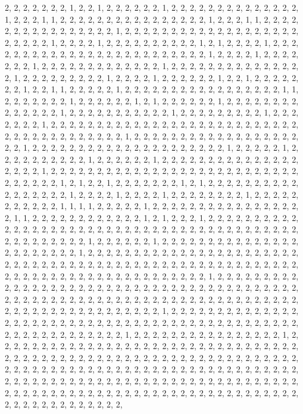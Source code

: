 \documentclass[
]{article}
\begin{document}
\begin{Schunk}
\begin{Soutput}
2, 2, 2, 2, 2, 2, 2, 1, 2, 2, 1, 2, 2, 2, 2, 2, 2, 1, 2, 2, 2, 2, 2, 2, 2, 2, 2, 2, 2, 2, 2, 2, 1, 2, 2, 2, 1, 1, 2, 2, 2, 2, 2, 2, 2, 2, 2, 2, 2, 2, 2, 2, 2, 2, 1, 2, 2, 2, 1, 1, 2, 2, 2, 2, 2, 2, 2, 2, 2, 2, 2, 2, 2, 2, 2, 2, 1, 2, 2, 2, 2, 2, 2, 2, 2, 2, 2, 2, 2, 2, 2, 2, 2, 2, 2, 2, 2, 2, 2, 2, 2, 1, 2, 2, 2, 2, 1, 2, 2, 2, 2, 2, 2, 2, 2, 2, 2, 1, 2, 1, 2, 2, 2, 2, 1, 2, 2, 2, 2, 2, 2, 2, 2, 2, 2, 2, 2, 2, 2, 2, 2, 2, 2, 2, 2, 2, 2, 2, 2, 2, 1, 2, 2, 2, 2, 1, 2, 2, 2, 2, 2, 2, 2, 1, 2, 2, 2, 2, 2, 2, 2, 2, 2, 2, 2, 2, 2, 1, 2, 2, 2, 2, 2, 2, 2, 2, 2, 2, 2, 2, 2, 2, 2, 1, 2, 2, 2, 2, 2, 2, 2, 2, 2, 1, 2, 2, 2, 2, 1, 2, 2, 2, 2, 2, 2, 1, 2, 2, 1, 2, 2, 2, 2, 2, 2, 2, 1, 2, 2, 1, 1, 2, 2, 2, 2, 2, 1, 2, 2, 2, 2, 2, 2, 2, 2, 2, 2, 2, 2, 2, 2, 2, 2, 2, 1, 1, 2, 2, 2, 2, 2, 2, 2, 1, 2, 2, 2, 2, 2, 2, 1, 2, 1, 2, 2, 2, 2, 2, 2, 1, 2, 2, 2, 2, 2, 2, 2, 2, 2, 2, 2, 2, 2, 2, 1, 2, 2, 2, 2, 2, 2, 2, 2, 2, 2, 2, 1, 2, 2, 2, 2, 2, 2, 2, 2, 2, 1, 2, 2, 2, 2, 2, 2, 2, 1, 2, 2, 2, 2, 2, 2, 2, 2, 2, 2, 2, 2, 2, 2, 2, 2, 2, 2, 2, 2, 2, 2, 2, 2, 2, 2, 2, 2, 2, 2, 2, 2, 2, 2, 2, 2, 2, 2, 2, 2, 1, 2, 2, 2, 2, 2, 2, 2, 2, 2, 2, 2, 2, 2, 2, 2, 2, 2, 2, 2, 2, 1, 2, 2, 2, 2, 2, 2, 2, 2, 2, 2, 2, 2, 2, 2, 2, 2, 2, 2, 2, 2, 2, 1, 2, 2, 2, 2, 2, 1, 2, 2, 2, 2, 2, 2, 2, 2, 2, 2, 1, 2, 2, 2, 2, 2, 2, 1, 2, 2, 2, 2, 2, 2, 2, 2, 2, 2, 2, 2, 2, 2, 2, 2, 2, 2, 2, 1, 2, 2, 2, 2, 2, 2, 2, 2, 2, 2, 2, 2, 2, 2, 2, 2, 2, 2, 2, 2, 2, 2, 2, 2, 2, 2, 2, 2, 2, 2, 2, 2, 2, 1, 2, 1, 2, 2, 1, 2, 2, 2, 2, 2, 2, 2, 1, 2, 1, 2, 2, 2, 2, 2, 2, 2, 2, 2, 2, 2, 2, 2, 2, 2, 2, 2, 1, 2, 2, 2, 2, 1, 2, 2, 2, 2, 1, 2, 2, 2, 2, 2, 2, 2, 2, 1, 2, 2, 2, 2, 2, 2, 2, 2, 2, 2, 2, 1, 1, 1, 1, 2, 2, 2, 2, 2, 1, 2, 2, 2, 2, 2, 2, 2, 2, 2, 2, 2, 2, 2, 2, 2, 2, 2, 1, 1, 2, 2, 2, 2, 2, 2, 2, 2, 2, 2, 2, 2, 1, 2, 1, 2, 2, 2, 1, 2, 2, 2, 2, 2, 2, 2, 2, 2, 2, 2, 2, 2, 2, 2, 2, 2, 2, 2, 2, 2, 2, 2, 2, 2, 2, 2, 2, 2, 2, 2, 2, 2, 2, 2, 2, 2, 2, 2, 2, 2, 2, 2, 2, 2, 2, 2, 2, 2, 2, 2, 1, 2, 2, 2, 2, 2, 2, 1, 2, 2, 2, 2, 2, 2, 2, 2, 2, 2, 2, 2, 2, 2, 2, 2, 2, 2, 2, 2, 2, 2, 2, 1, 2, 2, 2, 2, 2, 2, 2, 2, 2, 2, 2, 2, 2, 2, 2, 2, 2, 2, 2, 2, 2, 2, 2, 2, 2, 2, 2, 2, 2, 2, 2, 2, 2, 2, 2, 2, 2, 2, 2, 2, 2, 2, 2, 2, 2, 2, 2, 2, 2, 2, 2, 2, 2, 2, 2, 2, 2, 2, 2, 2, 2, 2, 2, 2, 2, 2, 2, 2, 2, 2, 2, 2, 2, 2, 2, 2, 2, 1, 2, 2, 2, 2, 2, 2, 2, 2, 2, 2, 2, 2, 2, 2, 2, 2, 2, 2, 2, 2, 2, 2, 2, 2, 2, 2, 2, 2, 2, 2, 2, 2, 2, 2, 2, 2, 2, 2, 2, 2, 2, 2, 2, 2, 2, 2, 2, 2, 2, 2, 2, 2, 2, 2, 2, 2, 2, 2, 2, 2, 2, 2, 2, 2, 2, 2, 2, 2, 2, 2, 2, 2, 2, 2, 2, 2, 2, 2, 2, 2, 2, 2, 2, 2, 2, 2, 2, 2, 2, 2, 1, 2, 2, 2, 2, 2, 2, 2, 2, 2, 2, 2, 2, 2, 2, 2, 2, 2, 2, 2, 2, 2, 2, 2, 2, 2, 2, 2, 2, 2, 2, 2, 2, 2, 2, 2, 2, 2, 2, 2, 2, 2, 2, 2, 2, 2, 2, 2, 2, 2, 2, 2, 2, 2, 2, 2, 2, 2, 2, 2, 1, 2, 2, 2, 2, 2, 2, 2, 2, 2, 2, 2, 2, 2, 2, 2, 2, 1, 2, 2, 2, 2, 2, 2, 2, 2, 2, 2, 2, 2, 2, 2, 2, 2, 2, 2, 2, 2, 2, 2, 2, 2, 2, 2, 2, 2, 2, 2, 2, 2, 2, 2, 2, 2, 2, 2, 2, 2, 2, 2, 2, 2, 2, 2, 2, 2, 2, 2, 2, 2, 2, 2, 2, 2, 2, 2, 2, 2, 2, 2, 2, 2, 2, 2, 2, 2, 2, 2, 2, 2, 2, 2, 2, 2, 2, 2, 2, 2, 2, 2, 2, 2, 2, 2, 2, 2, 2, 2, 2, 2, 2, 2, 2, 2, 2, 2, 2, 2, 2, 2, 2, 2, 2, 2, 2, 2, 2, 2, 2, 2, 2, 2, 2, 2, 2, 2, 2, 2, 2, 2, 2, 2, 2, 2, 2, 2, 2, 2, 2, 2, 2, 2, 2, 2, 2, 2, 2, 2, 2, 2, 2, 2, 2, 2, 2, 2, 2, 2, 2, 2, 2, 2, 2, 2, 2, 2, 2, 2, 2, 2, 2, 2, 2, 2, 2, 2, 2, 2, 2, 2, 2, 2, 
\end{Soutput}
\end{Schunk}
\end{document}
